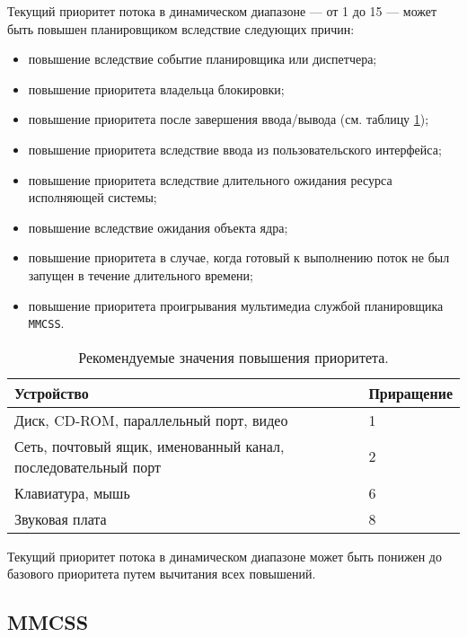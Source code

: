 Текущий приоритет потока в динамическом диапазоне --- от 1 до 15 --- может быть повышен планировщиком вследствие следующих причин:

\begin{itemize}
    \item повышение вследствие событие планировщика или диспетчера;
    \item повышение приоритета владельца блокировки;
    \item повышение приоритета после завершения ввода/вывода (см. таблицу \ref{tab:io});
    \item повышение приоритета вследствие ввода из пользовательского интерфейса;
    \item повышение приоритета вследствие длительного ожидания ресурса исполняющей системы;
    \item повышение вследствие ожидания объекта ядра;
    \item повышение приоритета в случае, когда готовый к выполнению поток не был запущен в течение длительного времени;
    \item повышение приоритета проигрывания мультимедиа службой планировщика \texttt{MMCSS}.
\end{itemize}


\begin{table}[h]
    \caption{Рекомендуемые значения повышения приоритета.}
    \begin{center}
        \begin{tabular}{|p{100mm}|l|}
            \hline
            \textbf{Устройство} & \textbf{Приращение} \\
            \hline
            Диск, CD-ROM, параллельный порт, видео & 1 \\
            \hline
            Сеть, почтовый ящик, именованный канал, последовательный порт & 2 \\
            \hline
            Клавиатура, мышь & 6 \\
            \hline
            Звуковая плата & 8 \\
            \hline
        \end{tabular}
    \end{center}
    \label{tab:io}
\end{table}

Текущий приоритет потока в динамическом диапазоне может быть понижен до базового приоритета путем вычитания всех повышений.

\subsection{MMCSS}

